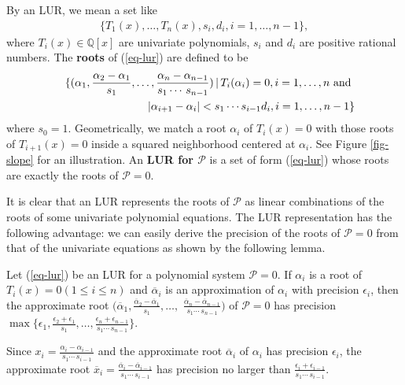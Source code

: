 \documentclass[amsthm]{JSC_LaTex_2007_Mar_12/elsart}
\def\bref#1{(\ref{#1})}
\def\Q{{\mathbb{Q}}}
\def\PS{ {\mathcal{P}} }
\begin{document}
By an LUR, we mean a set like
\begin{eqnarray}\label{eq-lur}
 \{T_1(x),\ldots,T_n(x), s_i,d_i, i=1,\ldots,n-1\},
\end{eqnarray}
where $T_i(x)\in \Q[x]$ are univariate polynomials, $s_i$ and $d_i$
are positive rational numbers. The {\bf roots} of \bref{eq-lur} are
defined to be
\begin{eqnarray}\label{eq-rt}
&&
\{(\alpha_1,\frac{\alpha_2-\alpha_1}{s_1},\ldots,\frac{\alpha_n-\alpha_{n-1}}{s_1\cdots\,s_{n-1}})
 \, |\, T_i(\alpha_i)=0, i=1,\ldots,n \hbox{ and }\nonumber\\
&& |\alpha_{i+1}-\alpha_i|<s_1\cdots s_{i-1}d_i, i=1,\ldots,n-1 \}
\end{eqnarray}
where $s_0=1$. Geometrically, we match a root $\alpha_i$ of
$T_{i}(x)=0$ with those roots of $T_{i+1}(x)=0$ inside a squared
neighborhood centered at $\alpha_i$. See Figure \ref{fig-slope} for
an illustration.
An {\bf LUR for $\mathcal{P}$} is a set of form \bref{eq-lur} whose
roots are exactly the roots of $\mathcal{P}=0$.

It is clear that an LUR represents the roots of $\mathcal{P}$ as
linear combinations of the roots of some univariate polynomial
equations. The LUR representation has the following advantage: we
can easily derive the precision of the roots of $\mathcal{P}=0$ from
that of the univariate equations as shown by the following lemma.

\begin{lem}
Let \bref{eq-lur} be an LUR for a polynomial system $\PS=0$. If
$\alpha_i$ is a root of $T_i(x)=0 (1\le i\le n)$ and
$\overline{\alpha}_i$ is an approximation of $\alpha_i$ with
precision $\epsilon_i$, then the approximate root
$(\overline{\alpha}_1,\frac{\overline{\alpha}_2-\overline{\alpha}_1}{s_1},\ldots,$
$\frac{\overline{\alpha}_n-\overline{\alpha}_{n-1}}{s_1\cdots\,s_{n-1}})$
of $\mathcal{P}=0$ has precision $\max\{\epsilon_1,
\frac{\epsilon_2+\epsilon_1}{s_1},\ldots,\frac{\epsilon_n+\epsilon_{n-1}}{s_1\cdots\,s_{n-1}}\}$.
\end{lem}
\begin{pf} Since $x_i
=\frac{\alpha_i-\alpha_{i-1}}{s_1\cdots\,s_{i-1}}$ and the
approximate root $\overline{\alpha}_i$ of $\alpha_i$ has precision
$\epsilon_i$,  the approximate root $\overline{x}_i
=\frac{\overline{\alpha}_i-\overline{\alpha}_{i-1}}{s_1\cdots\,s_{i-1}}$
has precision no larger than
$\frac{\epsilon_i+\epsilon_{i-1}}{s_1\cdots\,s_{i-1}}$.
\end{pf}
\end{document}
